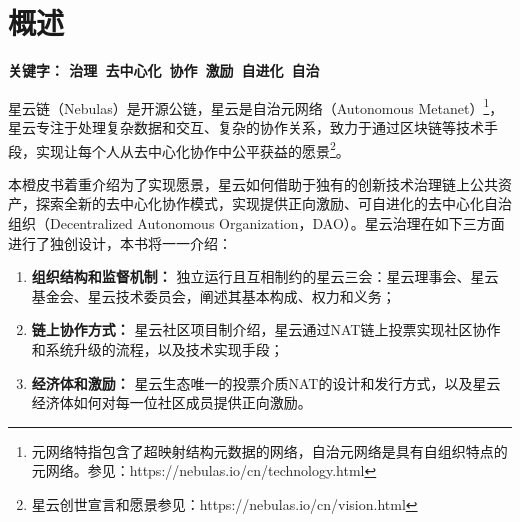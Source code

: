 \section{概述}

\textbf{关键字： 治理\ 去中心化\ 协作\ 激励\ 自进化\ 自治 }

星云链（Nebulas）是开源公链，星云是自治元网络（Autonomous Metanet）\footnote{元网络特指包含了超映射结构元数据的网络，自治元网络是具有自组织特点的元网络。参见：https://nebulas.io/cn/technology.html}，星云专注于处理复杂数据和交互、复杂的协作关系，致力于通过区块链等技术手段，实现让每个人从去中心化协作中公平获益的愿景\footnote{星云创世宣言和愿景参见：https://nebulas.io/cn/vision.html}。

本橙皮书着重介绍为了实现愿景，星云如何借助于独有的创新技术治理链上公共资产，探索全新的去中心化协作模式，实现提供正向激励、可自进化的去中心化自治组织（Decentralized Autonomous Organization，DAO）。星云治理在如下三方面进行了独创设计，本书将一一介绍：

\begin{enumerate}
	\item \textbf{组织结构和监督机制：}
	独立运行且互相制约的星云三会：星云理事会、星云基金会、星云技术委员会，阐述其基本构成、权力和义务；
	\item \textbf{链上协作方式：}
	星云社区项目制介绍，星云通过NAT链上投票实现社区协作和系统升级的流程，以及技术实现手段；
	\item \textbf{经济体和激励：}
	星云生态唯一的投票介质NAT的设计和发行方式，以及星云经济体如何对每一位社区成员提供正向激励。
\end{enumerate}